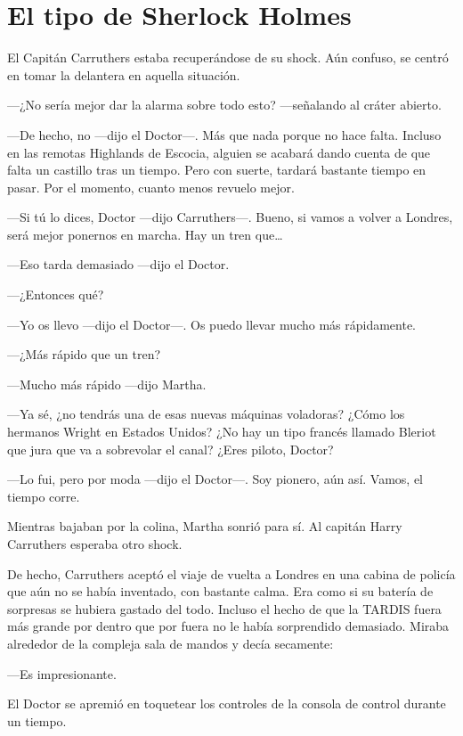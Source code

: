 \chapter*{El tipo de Sherlock Holmes}

El Capitán Carruthers estaba recuperándose de su shock. Aún confuso, se
centró en tomar la delantera en aquella situación.

---¿No sería mejor dar la alarma sobre todo esto? ---señalando al cráter
abierto.

---De hecho, no ---dijo el Doctor---. Más que nada porque no hace falta.
Incluso en las remotas Highlands de Escocia, alguien se acabará dando
cuenta de que falta un castillo tras un tiempo. Pero con suerte, tardará
bastante tiempo en pasar. Por el momento, cuanto menos revuelo mejor.

---Si tú lo dices, Doctor ---dijo Carruthers---. Bueno, si vamos a
volver a Londres, será mejor ponernos en marcha. Hay un tren que\ldots{}

---Eso tarda demasiado ---dijo el Doctor.

---¿Entonces qué?

---Yo os llevo ---dijo el Doctor---. Os puedo llevar mucho más
rápidamente.

---¿Más rápido que un tren?

---Mucho más rápido ---dijo Martha.

---Ya sé, ¿no tendrás una de esas nuevas máquinas voladoras? ¿Cómo los
hermanos Wright en Estados Unidos? ¿No hay un tipo francés llamado
Bleriot que jura que va a sobrevolar el canal? ¿Eres piloto, Doctor?

---Lo fui, pero por moda ---dijo el Doctor---. Soy pionero, aún así.
Vamos, el tiempo corre.

Mientras bajaban por la colina, Martha sonrió para sí. Al capitán Harry
Carruthers esperaba otro shock.

De hecho, Carruthers aceptó el viaje de vuelta a Londres en una cabina
de policía que aún no se había inventado, con bastante calma. Era como
si su batería de sorpresas se hubiera gastado del todo. Incluso el hecho
de que la TARDIS fuera más grande por dentro que por fuera no le había
sorprendido demasiado. Miraba alrededor de la compleja sala de mandos y
decía secamente:

---Es impresionante.

El Doctor se apremió en toquetear los controles de la consola de control
durante un tiempo.

